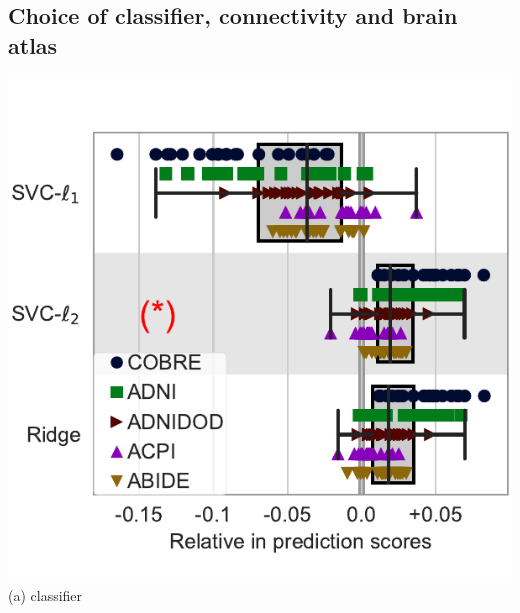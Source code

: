 \documentclass[portrait,a0,final]{a0poster} %
\begin{document}
\begin{minipage}{0.98\linewidth}
\begin{minipage}[t]{0.48\linewidth}
\subsection{Choice of classifier, connectivity and brain atlas}
\begin{center}
\begin{minipage}[t]{0.48\linewidth}
\begin{center}
\includegraphics[width=0.95\linewidth]{figures/impact_plot_classifier.pdf}\\\normalsize
(a) classifier
\end{center}
\end{minipage}
\hspace{0.02\linewidth} %
\begin{minipage}[t]{0.48\linewidth}
\begin{center}

\end{center}
\end{minipage}
\end{center}
\end{minipage}
\end{minipage}
\end{document}
